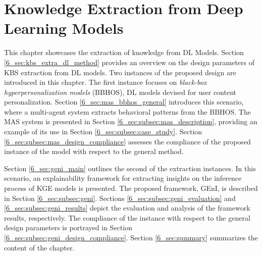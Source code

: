 \chapter{Knowledge Extraction from Deep Learning Models}
\label{chap:kbsextractiondl}
This chapter  showcases the extraction of knowledge from DL Models. Section \ref{6_sec:kbs_extra_dl_method} provides an overview on the design parameters of KBS extraction from DL models. Two instances of the proposed design are introduced in this chapter. The first instance focuses on \textit{black-box hyperpersonalization models} (BBHOS), DL models devised for user content personalization. Section \ref{6_sec:mas_bbhos_general} introduces this scenario, where a multi-agent system extracts behavioral patterns from the BBHOS. The MAS system is presented in Section \ref{6_sec:subsec:mas_description}, providing an example of its use in Section \ref{6_sec:subsec:case_study}. Section \ref{6_sec:subsec:mas_design_compliance} assesses the compliance of the proposed instance of the model with respect to the general method. 

Section \ref{6_sec:geni_main} outlines the second of the extraction instances. In this scenario, an explainability framework for extracting insights on the inference process of KGE models is presented. The proposed framework, GEnI, is described in Section \ref{6_sec:subsec:geni}. Sections \ref{6_sec:subsec:geni_evaluation} and \ref{6_sec:subsec:geni_results} depict the evaluation and analysis of the framework results, respectively. The compliance of the instance with respect to the general design parameters is portrayed in Section \ref{6_sec:subsec:geni_design_compliance}. Section \ref{6_sec:summary} summarizes the content of the chapter.


